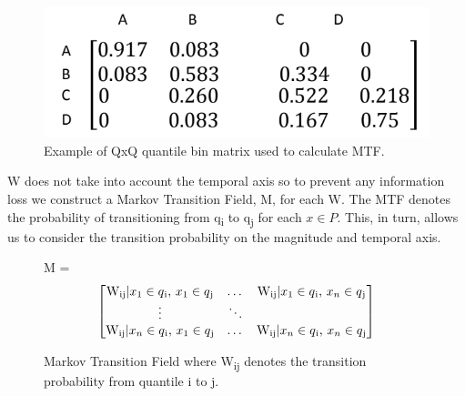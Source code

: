 \documentclass{turabian-thesis}
\begin{document}
\begin{figure}[h!]
   \begin{center}
      \includegraphics[scale=0.6]{../media/mtf_q.png}
   \end{center}
   \caption{Example of QxQ quantile bin matrix used to calculate MTF.}
   \label{fig:mtf_q}
\end{figure}
 





W does not take into account the temporal axis so to prevent any information loss we construct a Markov Transition Field, M, for each W. The MTF denotes the probability of transitioning from q\textsubscript{i} to q\textsubscript{j} for each $x \in P$. This, in turn, allows us to consider the transition probability on the magnitude and temporal axis.

\begin{figure}[h]
  \centering
  M =
  \[\begin{bmatrix}

  \text{W\textsubscript{ij}} | \text{$x\textsubscript{1} \in q\textsubscript{i}$, $x_{1} \in q\textsubscript{j}$}
  & \dots &
  
  \text{W\textsubscript{ij}}  |  \text{$x_{1} \in q\textsubscript{i}$, $x_{n} \in q\textsubscript{j}$} 
  
  \\
  
  \vdots &  \ddots & \\
  
  \text{W\textsubscript{ij}} | \text{$x_{n} \in q\textsubscript{i}$, $x_{1} \in q\textsubscript{j}$}
  & \dots &
  \text{W\textsubscript{ij}} | \text{$x_{n} \in q\textsubscript{i}$, $x_{n} \in q\textsubscript{j}$} \\
  
  
  \end{bmatrix}\]
  \caption{Markov Transition Field where  W\textsubscript{ij} denotes the transition probability from quantile i to j.}
  \label{fig:mtf}
\end{figure}
\end{document}
